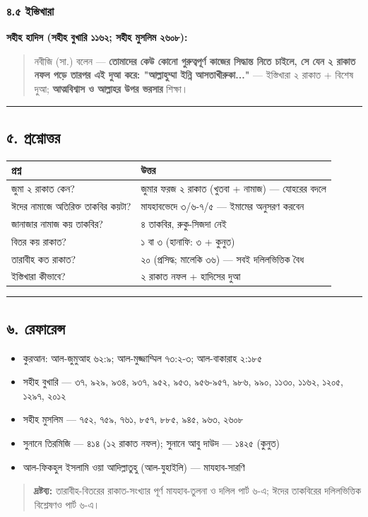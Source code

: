 \subsubsection*{৪.৫ ইস্তিখারা}

\textbf{সহীহ হাদিস (সহীহ বুখারি ১১৬২; সহীহ মুসলিম ২৬০৮):}

\begin{quote}
নবীজি (সা.) বলেন — \textbf{তোমাদের কেউ কোনো গুরুত্বপূর্ণ কাজের সিদ্ধান্ত নিতে চাইলে, সে যেন ২ রাকাত নফল পড়ে তারপর এই দুআ করে: "আল্লাহুম্মা ইন্নি আসতাখীরুকা..."} — ইস্তিখারা ২ রাকাত + বিশেষ দুআ; \textbf{আত্মবিশ্বাস ও আল্লাহর উপর ভরসার} শিক্ষা।
\end{quote}

\medskip\hrule\medskip

\subsection*{৫. প্রশ্নোত্তর}

\begin{table}[h]\centering\small
\begin{tabular}{ll}
প্রশ্ন & উত্তর \\
\hline
জুমা ২ রাকাত কেন? & জুমার ফরজ ২ রাকাত (খুতবা + নামাজ) — যোহরের বদলে \\
ঈদের নামাজে অতিরিক্ত তাকবির কয়টা? & মাযহাবভেদে ৩/৬-৭/৫ — ইমামের অনুসরণ করবেন \\
জানাজার নামাজ কয় তাকবির? & ৪ তাকবির, রুকু-সিজদা নেই \\
বিতর কয় রাকাত? & ১ বা ৩ (হানাফি: ৩ + কুনুত) \\
তারাবীহ কত রাকাত? & ২০ (প্রসিদ্ধ; মালেকি ৩৬) — সবই দলিলভিত্তিক বৈধ \\
ইস্তিখারা কীভাবে? & ২ রাকাত নফল + হাদিসের দুআ \\
\hline
\end{tabular}
\end{table}

\medskip\hrule\medskip

\subsection*{৬. রেফারেন্স}

\begin{itemize}
\item কুরআন: আল-জুমুআহ ৬২:৯; আল-মুজ্জাম্মিল ৭৩:২-৩; আল-বাকারাহ ২:১৮৫
\item সহীহ বুখারি — ৩৭, ৯২৯, ৯৩৪, ৯৩৭, ৯৫২, ৯৫৩, ৯৫৬-৯৫৭, ৯৮৬, ৯৯০, ১১৩০, ১১৬২, ১২০৫, ১২৯৭, ২০১২
\item সহীহ মুসলিম — ৭৫২, ৭৫৯, ৭৬১, ৮৫৭, ৮৮৫, ৯৪৫, ৯৬৩, ২৬০৮
\item সুনানে তিরমিজি — ৪১৪ (১২ রাকাত নফল); সুনানে আবু দাউদ — ১৪২৫ (কুনুত)
\item আল-ফিকহুল ইসলামি ওয়া আদিল্লাতুহু (আল-যুহাইলি) — মাযহাব-সারণি
\end{itemize}
\begin{quote}
\textbf{দ্রষ্টব্য:} তারাবীহ-বিতরের রাকাত-সংখ্যার পূর্ণ মাযহাব-তুলনা ও দলিল পার্ট ৬-এ; ঈদের তাকবিরের দলিলভিত্তিক বিশ্লেষণও পার্ট ৬-এ।
\end{quote}


